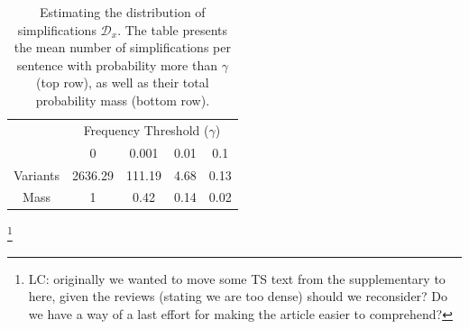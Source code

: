 \documentclass[11pt, a4paper]{article}
\newcommand{\lc}[1]{\footnote{\color{blue}LC: #1}}
\begin{document}



\begin{table}[t]
	\centering
	\small
	\singlespacing
	\begin{tabular}{c|c|c|c|c|}
		& \multicolumn{4}{c|}{Frequency Threshold ($\gamma$)}\\ 
		& \multicolumn{1}{c}{0} & \multicolumn{1}{c}{0.001} & \multicolumn{1}{c}{0.01} & \multicolumn{1}{c|}{0.1}
		\\
		\hline
		Variants & 2636.29 & 111.19 & 4.68 & 0.13
		\\
		Mass & 1 & 0.42 & 0.14 & 0.02\\
		\hline
	\end{tabular}
	\caption{\label{tab:simplifications_dist}
		Estimating the distribution of simplifications $\mathcal{D}_x$.
		The table presents the mean number of simplifications per sentence with probability more than
		$\gamma$ (top row), as well as their total probability mass (bottom row).
	}
\end{table}
\lc{originally we wanted to move some TS text from the supplementary to here, given the reviews (stating we are too dense) should we reconsider? Do we have a way of a last effort for making the article easier to comprehend?}
\end{document}
